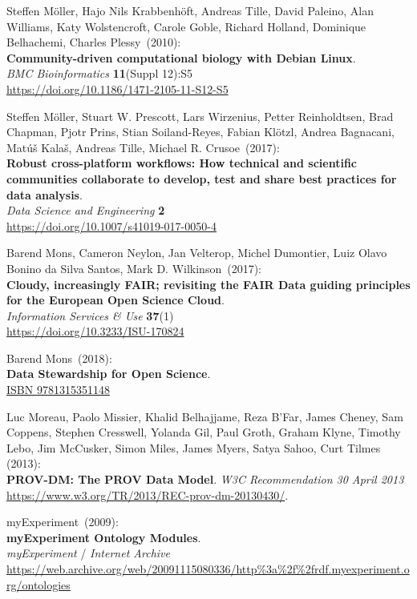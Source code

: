 \begin{thebibliography}{9}
Steffen Möller, Hajo Nils Krabbenhöft, Andreas Tille, David
Paleino, Alan Williams, Katy Wolstencroft, Carole Goble, Richard
Holland, Dominique Belhachemi, Charles Plessy~(2010):\\
\textbf{Community-driven computational biology with Debian Linux}.\\
\emph{BMC Bioinformatics} \textbf{11}(Suppl 12):S5\\
\url{https://doi.org/10.1186/1471-2105-11-S12-S5}

Steffen Möller, Stuart W. Prescott, Lars Wirzenius, Petter
Reinholdtsen, Brad Chapman, Pjotr Prins, Stian Soiland-Reyes, Fabian
Klötzl, Andrea Bagnacani, Matúš Kalaš, Andreas Tille, Michael R. Crusoe~(2017):\\
\textbf{Robust cross-platform workflows: How technical and scientific
communities collaborate to develop, test and share best practices for
data analysis}.\\
\emph{Data Science and Engineering} \textbf{2}\\
\url{https://doi.org/10.1007/s41019-017-0050-4}

Barend Mons, Cameron Neylon, Jan Velterop, Michel
Dumontier, Luiz Olavo Bonino da Silva Santos, Mark D. Wilkinson~(2017):\\
\textbf{Cloudy, increasingly FAIR; revisiting the FAIR Data guiding
principles for the European Open Science Cloud}.\\
\emph{Information Services \& Use} \textbf{37}(1)\\
\url{https://doi.org/10.3233/ISU-170824}

Barend Mons~(2018):\\
\textbf{Data Stewardship for Open Science}.\\
\href{https://identifiers.org/isbn/9781315351148}{ISBN 9781315351148}

Luc Moreau, Paolo Missier, Khalid Belhajjame, Reza B'Far, James Cheney, Sam Coppens, Stephen Cresswell, Yolanda Gil, Paul Groth, Graham Klyne, Timothy Lebo, Jim McCusker, Simon Miles, James Myers, Satya Sahoo, Curt Tilmes (2013):\\
\textbf{PROV-DM: The PROV Data Model}.
\emph{W3C Recommendation 30 April 2013}\\
\url{https://www.w3.org/TR/2013/REC-prov-dm-20130430/}.

myExperiment~(2009):\\
\textbf{myExperiment Ontology Modules}.\\
\emph{myExperiment} / \emph{Internet Archive}\\
\url{https://web.archive.org/web/20091115080336/http\%3a\%2f\%2frdf.myexperiment.org/ontologies}


\end{thebibliography}
